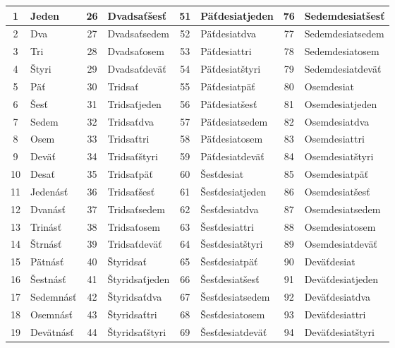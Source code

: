 \documentclass{report}
\begin{document}
\begin{table}[H]
  \centering
  \renewcommand{\arraystretch}{1.2}
  \begin{tabular}{|cl|cl|cl|cl|}
    \hline
    1 & Jeden & 26 & Dvadsaťšesť & 51 & Päťdesiatjeden & 76 & Sedemdesiatšesť \\
    \hline
    2 & Dva & 27 & Dvadsaťsedem & 52 & Päťdesiatdva & 77 & Sedemdesiatsedem \\
    \hline
    3 & Tri & 28 & Dvadsaťosem & 53 & Päťdesiattri & 78 & Sedemdesiatosem \\
    \hline
    4 & Štyri & 29 & Dvadsaťdeväť & 54 & Päťdesiatštyri & 79 & Sedemdesiatdeväť \\
    \hline
    5 & Päť & 30 & Tridsať & 55 & Päťdesiatpäť & 80 & Osemdesiat \\
    \hline
    6 & Šesť & 31 & Tridsaťjeden & 56 & Päťdesiatšesť & 81 & Osemdesiatjeden \\
    \hline
    7 & Sedem & 32 & Tridsaťdva & 57 & Päťdesiatsedem & 82 & Osemdesiatdva \\
    \hline
    8 & Osem & 33 & Tridsaťtri & 58 & Päťdesiatosem & 83 & Osemdesiattri \\
    \hline
    9 & Deväť & 34 & Tridsaťštyri & 59 & Päťdesiatdeväť & 84 & Osemdesiatštyri \\
    \hline
    10 & Desať & 35 & Tridsaťpäť & 60 & Šesťdesiat & 85 & Osemdesiatpäť \\
    \hline
    11 & Jedenásť & 36 & Tridsaťšesť & 61 & Šesťdesiatjeden & 86 & Osemdesiatšesť \\
    \hline
    12 & Dvanásť & 37 & Tridsaťsedem & 62 & Šesťdesiatdva & 87 & Osemdesiatsedem \\
    \hline
    13 & Trinásť & 38 & Tridsaťosem & 63 & Šesťdesiattri & 88 & Osemdesiatosem \\
    \hline
    14 & Štrnásť & 39 & Tridsaťdeväť & 64 & Šesťdesiatštyri & 89 & Osemdesiatdeväť \\
    \hline
    15 & Pätnásť & 40 & Štyridsať & 65 & Šesťdesiatpäť & 90 & Deväťdesiat \\
    \hline
    16 & Šestnásť & 41 & Štyridsaťjeden & 66 & Šesťdesiatšesť & 91 & Deväťdesiatjeden \\
    \hline
    17 & Sedemnásť & 42 & Štyridsaťdva & 67 & Šesťdesiatsedem & 92 & Deväťdesiatdva \\
    \hline
    18 & Osemnásť & 43 & Štyridsaťtri & 68 & Šesťdesiatosem & 93 & Deväťdesiattri \\
    \hline
    19 & Devätnásť & 44 & Štyridsaťštyri & 69 & Šesťdesiatdeväť & 94 & Deväťdesiatštyri \\

\end{tabular}
\end{table}
\end{document}
